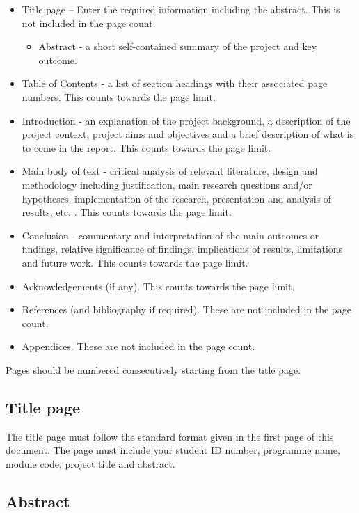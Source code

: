\documentclass[12pt]{article}
\begin{document}
\begin{itemize}
\item
  Title page -- Enter the required information including the abstract.
  This is not included in the page count.

  \begin{itemize}
  \item
    Abstract - a short self-contained summary of the project and key
    outcome.
  \end{itemize}
\item
  Table of Contents - a list of section headings with their associated
  page numbers. This counts towards the page limit.
\item
  Introduction - an explanation of the project background, a description
  of the project context, project aims and objectives and a brief
  description of what is to come in the report. This counts towards the
  page limit.
\item
  Main body of text - critical analysis of relevant literature, design
  and methodology including justification, main research questions
  and/or hypotheses, implementation of the research, presentation and
  analysis of results, etc. . This counts towards the page limit.
\item
  Conclusion - commentary and interpretation of the main outcomes or
  findings, relative significance of findings, implications of results,
  limitations and future work. This counts towards the page limit.
\item
  Acknowledgements (if any). This counts towards the page limit.
\item
  References (and bibliography if required). These are not included in
  the page count.
\item
  Appendices. These are not included in the page count.
\end{itemize}

Pages should be numbered consecutively starting from the title page.

\hypertarget{title-page}{%
\subsection{Title page}\label{title-page}}

The title page must follow the standard format given in the first page
of this document. The page must include your student ID number,
programme name, module code, project title and abstract.

\hypertarget{abstract}{%
\subsection{Abstract}\label{abstract}}
\end{document}
